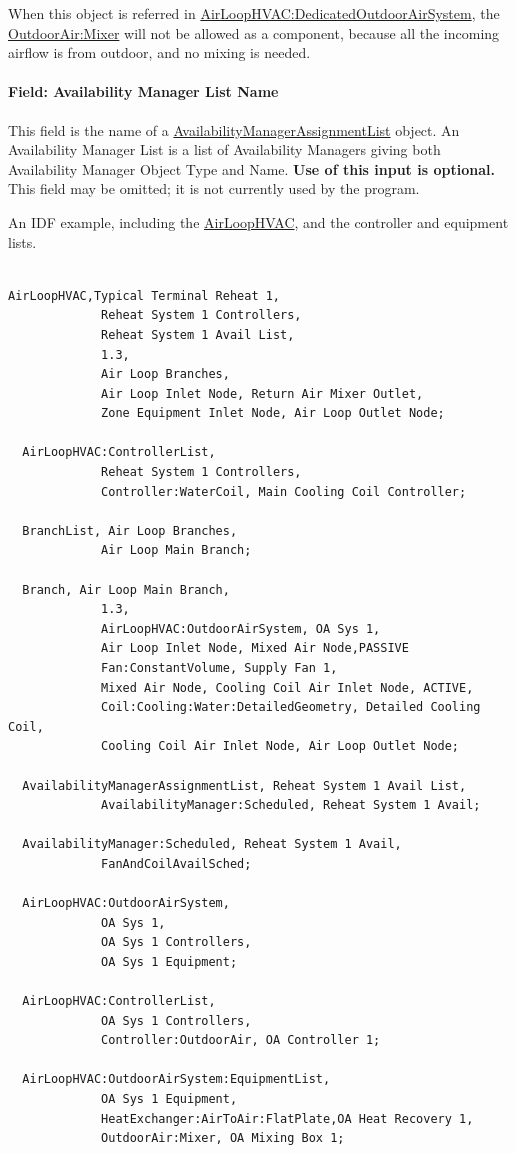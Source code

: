 When this object is referred in \hyperref[airloophvacdedicatedoutdoorairsystem]{AirLoopHVAC:DedicatedOutdoorAirSystem}, the \hyperref[outdoorairmixer]{OutdoorAir:Mixer} will not be allowed as a component, because all the incoming airflow is from outdoor, and no mixing is needed.

\paragraph{Field: Availability Manager List Name}\label{field-availability-manager-list-name-1}

This field is the name of a \hyperref[availabilitymanagerassignmentlist]{AvailabilityManagerAssignmentList} object. An Availability Manager List is a list of Availability Managers giving both Availability Manager Object Type and Name. \textbf{Use of this input is optional.} This field may be omitted; it is not currently used by the program.

An IDF example, including the \hyperref[airloophvac]{AirLoopHVAC}, and the controller and equipment lists.

\begin{lstlisting}

AirLoopHVAC,Typical Terminal Reheat 1,
             Reheat System 1 Controllers,
             Reheat System 1 Avail List,
             1.3,
             Air Loop Branches,
             Air Loop Inlet Node, Return Air Mixer Outlet,
             Zone Equipment Inlet Node, Air Loop Outlet Node;

  AirLoopHVAC:ControllerList,
             Reheat System 1 Controllers,
             Controller:WaterCoil, Main Cooling Coil Controller;

  BranchList, Air Loop Branches,
             Air Loop Main Branch;

  Branch, Air Loop Main Branch,
             1.3,
             AirLoopHVAC:OutdoorAirSystem, OA Sys 1,
             Air Loop Inlet Node, Mixed Air Node,PASSIVE
             Fan:ConstantVolume, Supply Fan 1,
             Mixed Air Node, Cooling Coil Air Inlet Node, ACTIVE,
             Coil:Cooling:Water:DetailedGeometry, Detailed Cooling Coil,
             Cooling Coil Air Inlet Node, Air Loop Outlet Node;

  AvailabilityManagerAssignmentList, Reheat System 1 Avail List,
             AvailabilityManager:Scheduled, Reheat System 1 Avail;

  AvailabilityManager:Scheduled, Reheat System 1 Avail,
             FanAndCoilAvailSched;

  AirLoopHVAC:OutdoorAirSystem,
             OA Sys 1,
             OA Sys 1 Controllers,
             OA Sys 1 Equipment;

  AirLoopHVAC:ControllerList,
             OA Sys 1 Controllers,
             Controller:OutdoorAir, OA Controller 1;

  AirLoopHVAC:OutdoorAirSystem:EquipmentList,
             OA Sys 1 Equipment,
             HeatExchanger:AirToAir:FlatPlate,OA Heat Recovery 1,
             OutdoorAir:Mixer, OA Mixing Box 1;
\end{lstlisting}

